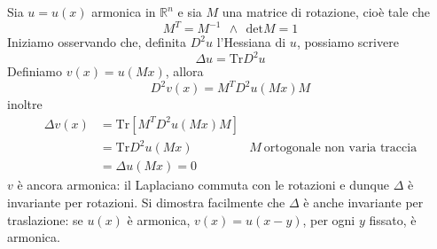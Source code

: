 \documentclass[10pt,a4paper,twoside,openright]{book}
\begin{document}
Sia $\displaystyle u=u(x)$ armonica in $\displaystyle \mathbb{R}^{n}$ e sia $\displaystyle M$ una matrice di rotazione, cioè tale che
\begin{equation*}
	M^{T} =M^{-1} \ \ \land \ \ \mathrm{det} M=1
\end{equation*}
Iniziamo osservando che, definita $\displaystyle D^{2} u$ l'Hessiana di $\displaystyle u$, possiamo scrivere
\begin{equation*}
	\Delta u=\mathrm{Tr} D^{2} u
\end{equation*}
Definiamo $\displaystyle v(x) =u(Mx)$, allora
\begin{equation*}
	D^{2} v(x) =M^{T} D^{2} u(Mx) M
\end{equation*}
inoltre
\begin{align*}
	\Delta v(x) & =\mathrm{Tr}\left[ M^{T} D^{2} u(Mx) M\right] &                                        \\
	             & =\mathrm{Tr} D^{2} u(Mx)                      & M\ \text{ortogonale non varia traccia} \\
	             & =\Delta u(Mx) =0                              &                                        
\end{align*}
$\displaystyle v$ è ancora armonica: il Laplaciano commuta con le rotazioni e dunque $\displaystyle \Delta $ è invariante per rotazioni. Si dimostra facilmente che $\displaystyle \Delta $ è anche invariante per traslazione: se $\displaystyle u(x)$ è armonica, $\displaystyle v(x) =u(x-y)$, per ogni $\displaystyle y$ fissato, è armonica.
\end{document}
